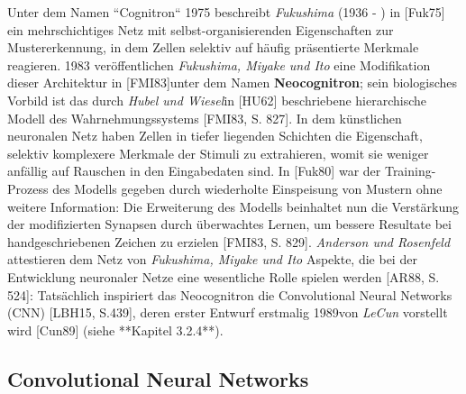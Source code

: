 Unter dem Namen ``Cognitron`` 1975 beschreibt \textit{Fukushima} (1936 - ) in [Fuk75] ein mehrschichtiges Netz mit selbst-organisierenden Eigenschaften zur Mustererkennung, in dem Zellen selektiv auf häufig präsentierte Merkmale reagieren. 1983 veröffentlichen \textit{Fukushima, Miyake und Ito} eine Modifikation dieser Architektur in [FMI83]\footnotemark[32] unter dem Namen \textbf{Neocognitron}\footnotemark[33]; sein biologisches Vorbild ist das durch \textit{Hubel und Wiesel}\footnotemark[34] in [HU62] beschriebene hierarchische Modell des Wahrnehmungssystems [FMI83, S. 827]. In dem künstlichen neuronalen Netz haben Zellen in tiefer liegenden Schichten die Eigenschaft, selektiv komplexere Merkmale der Stimuli zu extrahieren, womit sie weniger anfällig auf Rauschen in den Eingabedaten sind. In [Fuk80] war der Training-Prozess des Modells gegeben durch wiederholte Einspeisung von Mustern ohne weitere Information\footnotemark[35] [Fuk80, S.197]: Die Erweiterung des Modells beinhaltet nun die Verstärkung der modifizierten Synapsen durch überwachtes Lernen\footnotemark[36], um bessere Resultate bei handgeschriebenen Zeichen zu erzielen [FMI83, S. 829].
\textit{Anderson und Rosenfeld} attestieren dem Netz von \textit{Fukushima, Miyake und Ito} Aspekte, die bei der Entwicklung neuronaler Netze eine wesentliche Rolle spielen werden [AR88, S. 524]:  Tatsächlich inspiriert das Neocognitron die Convolutional Neural Networks (CNN) [LBH15, S.439], deren erster Entwurf erstmalig 1989\footnotemark[37] von \textit{LeCun} vorstellt wird [Cun89] (siehe **Kapitel 3.2.4**).



\subsection{Convolutional Neural Networks}


